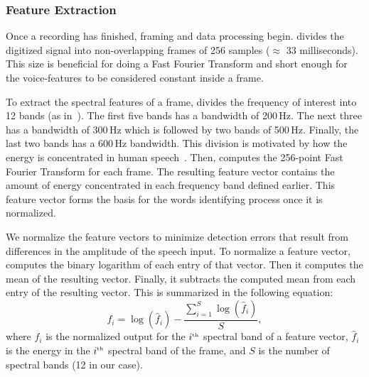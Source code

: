 \subsubsection{Feature Extraction}
Once a recording has finished, framing and data processing begin. \cim divides the digitized signal into non-overlapping frames of 256 samples ($\approx$ 33 milliseconds). This size is beneficial for doing a Fast Fourier Transform and short enough for the voice-features to be considered constant inside a frame.

To extract the spectral features of a frame, \cim divides the frequency of interest into 12 bands (as in~\cite{hopper1992}). The first five bands has a bandwidth of 200\,Hz. The next three has a bandwidth of 300\,Hz which is followed by two bands of 500\,Hz. Finally, the last two bands has a 600\,Hz bandwidth. This division is motivated by how the energy is concentrated in human speech~\cite{hopper1992}. Then, \cim computes the 256-point Fast Fourier Transform for each frame. The resulting feature vector contains the amount of energy concentrated in each frequency band defined earlier. This feature vector forms the basis for the words identifying process once it is normalized.

We normalize the feature vectors to minimize detection errors that result from differences in the amplitude of the speech input. To normalize a feature vector, \cim computes the binary logarithm of each entry of that vector. 
Then it computes the mean of the resulting vector. Finally, it subtracts the computed mean from each entry of the resulting vector. This is summarized in the following equation: 
\begin{equation}
    f_i = \log(\hat{f}_i) - \frac{\sum\limits^S_{i=1}\log(\hat{f}_i)}{S},
\end{equation}
where $f_i$ is the normalized output for the $i^{\text{\tiny th}}$ spectral band of a feature vector, $\hat{f}_i$ is the energy in the $i^{\text{\tiny th}}$ spectral band of the frame, and $S$ is the number of spectral bands (12 in our case). 

